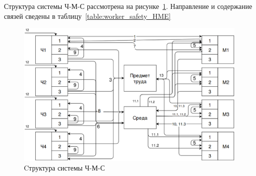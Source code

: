 Структура системы Ч-М-С рассмотрена на рисунке~\ref{fig:worker_safety_hme}.
Направление и содержание связей сведены в таблицу~\ref{table:worker_safety_HME}

\begin{figure}
    \begin{center}
       \includegraphics[width=1\textwidth]{graphics/worker_safety_hme.eps}
    \end{center}
    \caption{Cтруктура системы Ч-М-С}
    \label{fig:worker_safety_hme}
\end{figure}

